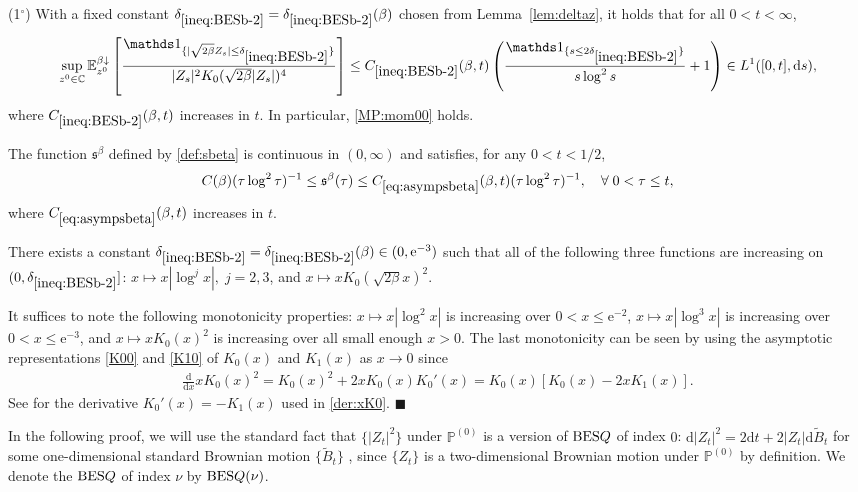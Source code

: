 \documentclass[12pt, twoside]{article}
\numberwithin{figure}{section}
\newcommand{\BES}{{\rm BES}}
\newcommand{\e}{{\mathrm e}}
\newcommand{\1}{\mathds 1}
\newcommand{\da}{{\downarrow}}
\renewcommand{\P}{{\mathbb P}}
\newcommand{\E}{{\mathbb E}}
\renewcommand{\d}{{\mathrm d}}
\newcommand{\2}{{\mathbf 1}}
\newcommand{\s}{{\mathfrak s}}
\renewenvironment{proof}[1][\proofname]{\noindent {\bfseries #1.}\;}{\hfill\ensuremath{\blacksquare}\\}
\newcommand{\cc}{{^\circ}}
\newcommand{\deltaz}{\delta_{\ref{ineq:BESb-2}}}
\begin{document}
\begin{prop}\label{prop:BESmom}
{\rm (1$\cc$)} With a fixed constant $\deltaz=\deltaz(\beta)$ chosen from Lemma~\ref{lem:deltaz}, it holds that for all $0< t<\infty$,
\begin{align}
\begin{split}
\sup_{z^0\in \Bbb C}\E_{z^0}^{\beta\da}\left[\frac{\1_{\{|\sqrt{2\beta}Z_s|\leq \deltaz\}}}{|Z_s|^2K_0(\sqrt{2\beta}|Z_s|)^4}\right]
\leq C_{\ref{ineq:BESb-2}}(\beta,t)\left(\frac{\1_{\{s\leq 2\deltaz\}}}{s\log^2 s}+1\right)\in L^1([0,t],\d s),\label{ineq:BESb-2}
\end{split}
\end{align}
where $ C_{\ref{ineq:BESb-2}}(\beta,t)$ increases in $t$. In particular, \eqref{MP:mom00} holds. \smallskip 
 
\noindent {\rm (2$\cc$)} The function $\s^\beta$ defined by \eqref{def:sbeta} is continuous in $(0,\infty)$ and satisfies, for any $0<t<1/2$,
\begin{align}\label{eq:asympsbeta}
C(\beta)(\tau\log^2\tau)^{-1}\leq 
\s^\beta(\tau)\leq C_{\ref{eq:asympsbeta}}(\beta,t)(\tau \log^2\tau)^{-1},\quad \forall\;0<\tau\leq t,
\end{align}
where $C_{\ref{eq:asympsbeta}}(\beta,t)$ increases in $t$.
\end{prop} 

\begin{lem}\label{lem:deltaz}
There exists a constant $\deltaz=\deltaz(\beta)\in (0,\e^{-3})$ such that all of the following three functions are increasing on $(0,\deltaz]$: $x\mapsto x|\log ^jx|,\;j=2,3$, and $x\mapsto x K_0(\sqrt{2\beta}x)^2$.
\end{lem}
\begin{proof}
It suffices to note the following monotonicity properties: $x\mapsto x|\log^2 x|$ is increasing over $0<x\leq \e^{-2}$, $x\mapsto x|\log^3 x|$ is increasing over $0<x\leq \e^{-3}$, and $x\mapsto xK_0(x)^2$ is increasing over all small enough $x>0$. The last monotonicity can be seen 
by using the asymptotic representations \eqref{K00} and \eqref{K10} of $K_0(x)$ and $K_1(x)$ as $x\to 0$ since
\begin{align}\label{der:xK0}
\frac{\d}{\d x} xK_0(x)^2=K_0(x)^2+2xK_0(x)K_0'(x)=K_0(x)[K_0(x)-2xK_1(x)].
\end{align}
See \cite[(5.7.9) on p.110]{Lebedev} for the derivative $K_0'(x)=-K_1(x)$ used in \eqref{der:xK0}. 
\end{proof}

In the following proof, we will use the standard fact that
$\{|Z_t|^2\}$ under $\P^{(0)}$ is a version of $\BES Q$ of index $0$: $\d |Z_t|^2=2\d t+2|Z_t|\d \tilde{B}_t$ for some one-dimensional standard Brownian motion $\{\tilde{B}_t\}$ \cite[p.439]{RY}, since $\{Z_t\}$ is a two-dimensional Brownian motion under $\P^{(0)}$ by definition. We denote the $\BES Q$ of index $\nu$ by $\BES Q(\nu)$.  \smallskip 
\end{document}
